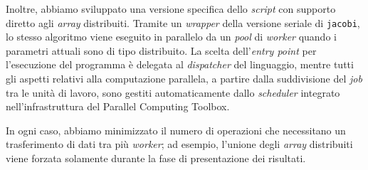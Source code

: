 Inoltre, abbiamo sviluppato una versione specifica dello \textit{script} con supporto diretto agli \textit{array} distribuiti.\newline
Tramite un \textit{wrapper} della versione seriale di \lstinline{jacobi}, lo stesso algoritmo viene eseguito in parallelo da un \textit{pool} di \textit{worker}
quando i parametri attuali sono di tipo distribuito.\newline
La scelta dell'\textit{entry point} per l'esecuzione del programma \`e delegata al \textit{dispatcher} del linguaggio,
mentre tutti gli aspetti relativi alla computazione parallela, a partire dalla suddivisione del \textit{job} tra le unit\`a di lavoro, sono
gestiti automaticamente dallo \textit{scheduler} integrato nell'infrastruttura del Parallel Computing Toolbox.

In ogni caso, abbiamo minimizzato il numero di operazioni che necessitano un trasferimento di dati tra pi\`u \textit{worker}; ad esempio,
l'unione degli \textit{array} distribuiti viene forzata solamente durante la fase di presentazione dei risultati.

